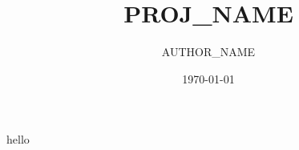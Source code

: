 \documentclass[12pt]{article}
\author{{{AUTHOR_NAME}}}
\date{\today}
\title{{{PROJ_NAME}}}
\begin{document}
\maketitle

hello
\end{document}
